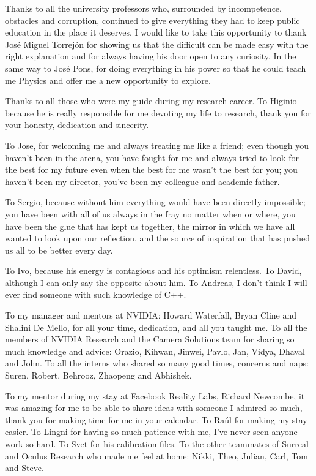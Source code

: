 Thanks to all the university professors who, surrounded by incompetence, obstacles and corruption, continued to give everything they had to keep public education in the place it deserves. I would like to take this opportunity to thank José Miguel Torrejón for showing us that the difficult can be made easy with the right explanation and for always having his door open to any curiosity. In the same way to José Pons, for doing everything in his power so that he could teach me Physics and offer me a new opportunity to explore.

Thanks to all those who were my guide during my research career. To Higinio because he is really responsible for me devoting my life to research, thank you for your honesty, dedication and sincerity.

To Jose, for welcoming me and always treating me like a friend; even though you haven't been in the arena, you have fought for me and always tried to look for the best for my future even when the best for me wasn't the best for you; you haven't been my director, you've been my colleague and academic father.

To Sergio, because without him everything would have been directly impossible; you have been with all of us always in the fray no matter when or where, you have been the glue that has kept us together, the mirror in which we have all wanted to look upon our reflection, and the source of inspiration that has pushed us all to be better every day.

To Ivo, because his energy is contagious and his optimism relentless. To David, although I can only say the opposite about him. To Andreas, I don't think I will ever find someone with such knowledge of C++.

To my manager and mentors at NVIDIA: Howard Waterfall, Bryan Cline and Shalini De Mello, for all your time, dedication, and all you taught me. To all the members of NVIDIA Research and the Camera Solutions team for sharing so much knowledge and advice: Orazio, Kihwan, Jinwei, Pavlo, Jan, Vidya, Dhaval and John. To all the interns who shared so many good times, concerns and naps: Suren, Robert, Behrooz, Zhaopeng and Abhishek.

To my mentor during my stay at Facebook Reality Labs, Richard Newcombe, it was amazing for me to be able to share ideas with someone I admired so much, thank you for making time for me in your calendar. To Raúl for making my stay easier. To Lingni for having so much patience with me, I've never seen anyone work so hard. To Svet for his calibration files. To the other teammates of Surreal and Oculus Research who made me feel at home: Nikki, Theo, Julian, Carl, Tom and Steve.


